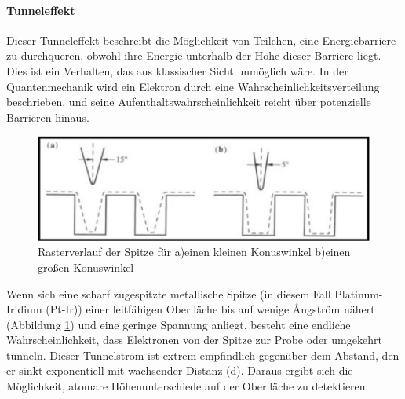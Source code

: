 \paragraph{Tunneleffekt}
Dieser Tunneleffekt beschreibt die Möglichkeit von Teilchen, eine Energiebarriere zu durchqueren, obwohl ihre Energie unterhalb der Höhe dieser Barriere liegt. Dies ist ein Verhalten, das aus klassischer Sicht unmöglich wäre. In der Quantenmechanik wird ein Elektron durch eine Wahrscheinlichkeitsverteilung beschrieben, und seine Aufenthaltswahrscheinlichkeit reicht über potenzielle Barrieren hinaus.\\
\begin{figure}[H]
\centering
\includegraphics[width=\linewidth]{figs/tunnelspitze}
\caption{ Rasterverlauf der Spitze für a)einen kleinen Konuswinkel b)einen großen Konuswinkel \cite{piezo}}
\label{fig:raster}
\end{figure} 



Wenn sich eine scharf zugespitzte metallische Spitze (in diesem Fall Platinum-Iridium (Pt-Ir)) einer leitfähigen Oberfläche bis auf wenige Ångström nähert (Abbildung \ref{fig:raster}) und eine geringe Spannung anliegt, besteht eine endliche Wahrscheinlichkeit, dass Elektronen von der Spitze zur Probe oder umgekehrt tunneln. Dieser Tunnelstrom ist extrem empfindlich gegenüber dem Abstand, den er sinkt exponentiell mit wachsender Distanz (d). 
Daraus ergibt sich die Möglichkeit, atomare Höhenunterschiede auf der Oberfläche zu detektieren.


